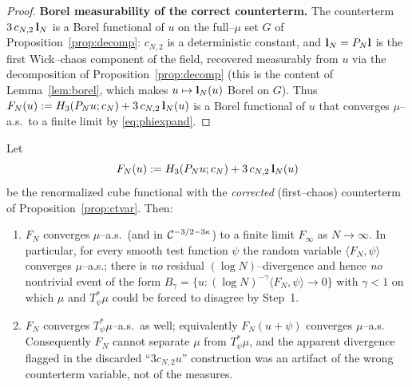 \begin{proof}
\medskip
\textbf{Borel measurability of the correct counterterm.}
The counterterm $3\,c_{N,2}\,\mathbf{l}_N$ is a Borel functional of $u$ on the
full--$\mu$ set $G$ of Proposition~\ref{prop:decomp}: $c_{N,2}$ is a deterministic
constant, and $\mathbf{l}_N=P_N\mathbf{l}$ is the first Wick--chaos component of the
field, recovered measurably from $u$ via the decomposition of
Proposition~\ref{prop:decomp} (this is the content of Lemma~\ref{lem:borel}, which
makes $u\mapsto\mathbf{l}_N(u)$ Borel on $G$). Thus
$F_N(u):=H_3(P_N u;c_N)+3\,c_{N,2}\,\mathbf{l}_N(u)$ is a Borel functional of
$u$ that converges $\mu$--a.s.\ to a finite limit by \eqref{eq:phiexpand}.
\end{proof}

\begin{qonelemma}\label{lem:noBgamma}
Let
\[
F_N(u):=H_3(P_N u;c_N)+3\,c_{N,2}\,\mathbf{l}_N(u)
\]
be the renormalized cube functional with the \emph{corrected} (first--chaos)
counterterm of Proposition~\ref{prop:ctvar}. Then:
\begin{enumerate}
\item[\rm(a)] $F_N$ converges $\mu$--a.s.\ (and in $\mathcal{C}^{-3/2-3\kappa}$) to a finite
limit $F_\infty$ as $N\to\infty$. In particular, for every smooth test function
$\psi$ the random variable $\langle F_N,\psi\rangle$ converges $\mu$--a.s.; there is
\emph{no} residual $(\log N)$--divergence and hence \emph{no} nontrivial event of the
form $B_\gamma=\{u:(\log N)^{-\gamma}\langle F_N,\psi\rangle\to0\}$ with $\gamma<1$ on
which $\mu$ and $T_\psi^*\mu$ could be forced to disagree by Step~1.
\item[\rm(b)] $F_N$ converges $T_\psi^*\mu$--a.s.\ as well; equivalently
$F_N(u+\psi)$ converges $\mu$--a.s. Consequently $F_N$ cannot separate $\mu$ from
$T_\psi^*\mu$, and the apparent divergence flagged in the discarded ``$3c_{N,2}u$''
construction was an artifact of the wrong counterterm variable, not of the measures.
\end{enumerate}
\end{qonelemma}

